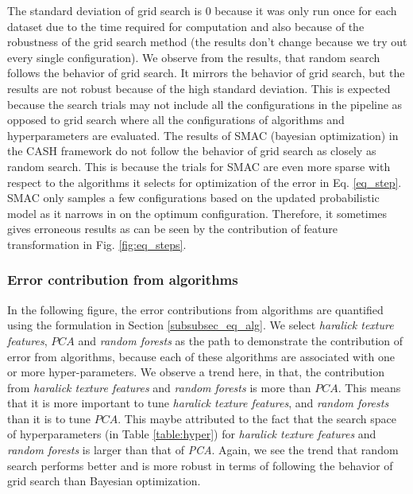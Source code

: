  The standard deviation of grid search is 0 because it was only run once for each dataset due to the time required for computation and also because of the robustness of the grid search method (the results don't change because we try out every single configuration). We observe from the results, that random search follows the behavior of grid search. It mirrors the behavior of grid search, but the results are not robust because of the high standard deviation. This is expected because the search trials may not include all the configurations in the pipeline as opposed to grid search where all the configurations of algorithms and hyperparameters are evaluated. The results of SMAC (bayesian optimization) in the CASH framework do not follow the behavior of grid search as closely as random search. This is because the trials for SMAC are even more sparse with respect to the algorithms it selects for optimization of  the error in Eq. \ref{eq_step}. SMAC only samples a few configurations based on the updated probabilistic model as it narrows in on the optimum configuration. Therefore, it sometimes gives erroneous results as can be seen by the contribution of feature transformation in Fig. \ref{fig:eq_steps}.


\subsubsection{Error contribution from algorithms}

In the following figure, the error contributions from algorithms are quantified using the formulation in Section \ref{subsubsec_eq_alg}. We select \textit{haralick texture features}, $PCA$ and \textit{random forests} as the path to demonstrate the contribution of error from algorithms, because each of these algorithms are associated with one or more hyper-parameters. We observe a trend here, in that, the contribution from \textit{haralick texture features} and \textit{random forests} is more than $PCA$. This means that it is more important to tune \textit{haralick texture features}, and \textit{random forests} than it is to tune  $PCA$. This maybe attributed to the fact that the search space of hyperparameters (in Table \ref{table:hyper}) for \textit{haralick texture features} and \textit{random forests} is larger than that of \textit{PCA}. Again, we see the trend that random search performs better and is more robust in terms of following the behavior of grid search than Bayesian optimization.


